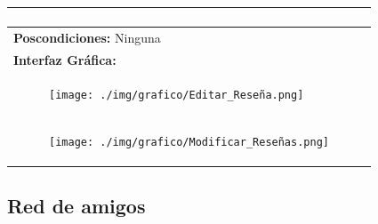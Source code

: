 \documentclass{report}
\begin{document}
\begin{center}
\begin{longtable}{|p{\linewidth}|}
\begin{enumerate}
                \end{enumerate}\\
                \hline
                \textbf{Poscondiciones:} Ninguna\\
                \hline
                \textbf{Interfaz Gráfica:}\\
                \begin{figure}[H]
                    \centering
                    \texttt{[image: ./img/grafico/Editar\_Reseña.png]}
                \end{figure}\\
                \hline
                \begin{figure}[H]
                    \centering
                    \texttt{[image: ./img/grafico/Modificar\_Reseñas.png]}
                \end{figure}\\
                \hline
            \end{longtable}
        \end{center}
        \clearpage
        \subsection{Red de amigos}
        \clearpage
\end{document}

